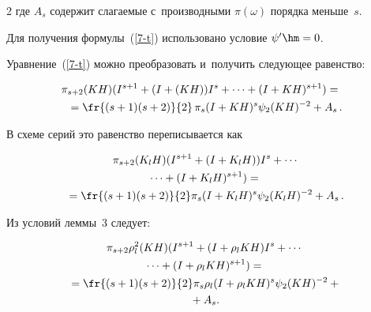 \begin{multicols}{2}
где $A_s$ содержит слагаемые с~производными $\pi(\omega)$ порядка меньше~$s$.

Для получения формулы~(\ref{7-t}) использовано условие $\psi'\hm=0$.



Уравнение~(\ref{7-t}) можно преобразовать и~получить следующее равенство:



\noindent

\begin{multline*}

\hspace*{-3mm}\pi_{s+2}(KH)(I^{s+1}+(I+(KH))I^s+\cdots +(I+KH)^{s+1})={}\hspace*{-1.96pt}\\

{}=\fr{(s+1)(s+2)}{2}\,\pi_{s} (I+KH)^{s} \psi_{2} (KH)^{-2}+A_s\,.

\end{multline*}

В схеме серий это равенство переписывается как



\noindent

\begin{multline*}

 \pi_{s+2}(K_lH)(I^{s+1}+(I+K_lH))I^s+\cdots\\

 {}\cdots +(I+K_lH)^{s+1})={}

\\

 {}=\fr{(s+1)(s+2)}{2}\pi_{s} (I+K_lH)^{s} \psi_{2} (K_lH)^{-2}+A_s \,.

\end{multline*}



Из условий леммы~3 следует:

\begin{multline}

\pi_{s+2}\rho_l^2(KH)(I^{s+1}+(I+\rho_lKH)I^s+\cdots{}\\

{}\cdots

+(I+\rho_lKH)^{s+1})={}\\

{}=\fr{(s+1)(s+2)}{2}\pi_{s} \rho_l (I+\rho_l KH)^{s} \psi_{2} (KH)^{-2}+{}\\

{}+A_s.

\label{8-t}

\end{multline}


\end{multicols}
